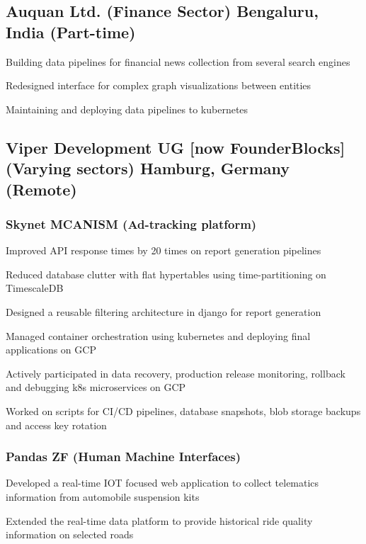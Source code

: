 \documentclass[letter,10pt]{article}
\begin{document}

\subsection{Auquan Ltd. (Finance Sector) \hfill Bengaluru, India (Part-time)}
\begin{zitemize}
\item Building data pipelines for financial news collection from several search engines
\item Redesigned interface for complex graph visualizations between entities
\item Maintaining and deploying data pipelines to kubernetes
\end{zitemize}


\subsection{Viper Development UG [now FounderBlocks] (Varying sectors) \hfill Hamburg, Germany (Remote)}

\vspace{1em}
\subsubsection*{Skynet MCANISM (Ad-tracking platform)}
\begin{zitemize}
\item Improved API response times by 20 times on report generation pipelines
\item Reduced database clutter with flat hypertables using time-partitioning on TimescaleDB
\item Designed a reusable filtering architecture in django for report generation
\item Managed container orchestration using kubernetes and deploying final applications on GCP
\item Actively participated in data recovery, production release monitoring, rollback and debugging k8s microservices on GCP
\item Worked on scripts for CI/CD pipelines, database snapshots, blob storage backups and access key rotation
\end{zitemize}

\subsubsection*{Pandas ZF (Human Machine Interfaces)}
\begin{zitemize}
\item Developed a real-time IOT focused web application to collect telematics information from automobile suspension kits
\item Extended the real-time data platform to provide historical ride quality information on selected roads
\end{zitemize}
\end{document}
